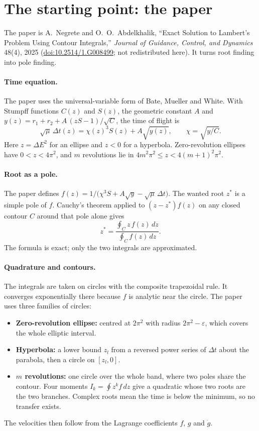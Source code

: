 \documentclass[11pt]{article}
\begin{document}
\section{The starting point: the paper}

The paper is A.~Negrete and O.~O.~Abdelkhalik, ``Exact Solution to Lambert's Problem Using Contour Integrals,'' \emph{Journal of Guidance, Control, and Dynamics} 48(4), 2025 (\href{https://doi.org/10.2514/1.G008499}{doi:10.2514/1.G008499}; not redistributed here). It turns root finding into pole finding.

\paragraph{Time equation.} The paper uses the universal-variable form of Bate, Mueller and White. With Stumpff functions $C(z)$ and $S(z)$, the geometric constant $A$ and $y(z) = r_1 + r_2 + A\,(zS-1)/\sqrt{C}$, the time of flight is
\begin{equation}
  \sqrt{\mu}\,\Delta t(z) = \chi(z)^3 S(z) + A\sqrt{y(z)}, \qquad \chi = \sqrt{y/C}.
\end{equation}
Here $z = \Delta E^2$ for an ellipse and $z<0$ for a hyperbola. Zero-revolution ellipses have $0<z<4\pi^2$, and $m$ revolutions lie in $4m^2\pi^2 \le z < 4(m+1)^2\pi^2$.

\paragraph{Root as a pole.} The paper defines $f(z) = 1/\big(\chi^3 S + A\sqrt{y} - \sqrt{\mu}\,\Delta t\big)$. The wanted root $z^*$ is a simple pole of $f$. Cauchy's theorem applied to $(z-z^*)f(z)$ on any closed contour $C$ around that pole alone gives
\begin{equation}
  z^* = \frac{\oint_C z\,f(z)\,dz}{\oint_C f(z)\,dz}.
\end{equation}
The formula is exact; only the two integrals are approximated.

\paragraph{Quadrature and contours.} The integrals are taken on circles with the composite trapezoidal rule. It converges exponentially there because $f$ is analytic near the circle. The paper uses three families of circles:
\begin{itemize}
  \item \textbf{Zero-revolution ellipse:} centred at $2\pi^2$ with radius $2\pi^2-\varepsilon$, which covers the whole elliptic interval.
  \item \textbf{Hyperbola:} a lower bound $z_l$ from a reversed power series of $\Delta t$ about the parabola, then a circle on $[z_l,0]$.
  \item \textbf{$m$ revolutions:} one circle over the whole band, where two poles share the contour. Four moments $I_k = \oint z^k f\,dz$ give a quadratic whose two roots are the two branches. Complex roots mean the time is below the minimum, so no transfer exists.
\end{itemize}
The velocities then follow from the Lagrange coefficients $f$, $g$ and $\dot g$.
\end{document}
